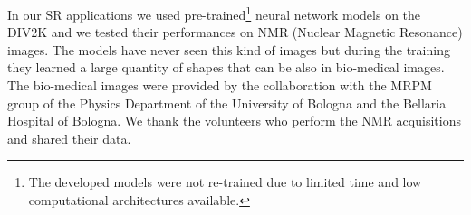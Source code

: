 \documentclass{standalone}
\begin{document}
In our SR applications we used pre-trained\footnote{
  The developed models were not re-trained due to limited time and low computational architectures available.
} neural network models on the DIV2K and we tested their performances on NMR (Nuclear Magnetic Resonance) images.
The models have never seen this kind of images but during the training they learned a large quantity of shapes that can be  also in bio-medical images.
The bio-medical images were provided by the collaboration with the MRPM group of the Physics Department of the University of Bologna and the Bellaria Hospital of Bologna.
We thank the volunteers who perform the NMR acquisitions and shared their data.
\end{document}

